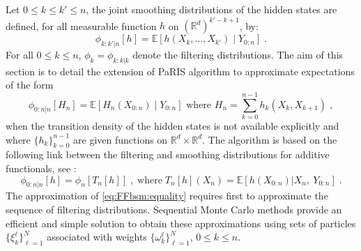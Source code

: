 \documentclass[12pt]{article}
\newcommand{\eqsp}{\;}
\newcommand{\1}{\mathrm{1}}
\newcommand{\E}{\mathbb{E}}
\begin{document}
Let $0 \leq k \leq k' \leq n$, the joint smoothing distributions of the hidden states are defined, for all measurable function $h$ on $(\mathbb{R}^d)^{k'-k + 1}$, by:
\[
\phi_{k:k'|n}[h] = \mathbb{E}\left[h(X_k,\ldots,X_{k'})\middle|Y_{0:n}\right]\eqsp.
\]
For all $0\le k\le n$, $\phi_{k} = \phi_{k:k|k}$ denote the filtering distributions. The aim of this section is to detail the extension of PaRIS algorithm to approximate expectations of the form
\begin{equation}
\label{def:addfunc}
\phi_{0:n\vert n}[H_{n}] = \mathbb{E}\left[H_n(X_{0:n})\middle|Y_{0:n}\right] \text{ where } H_n=\sum_{k=0}^{n-1}h_k(X_k,X_{k+1})\eqsp,
\end{equation}
when the transition density of the hidden states is not available explicitly and where $\{h_k\}_{k=0}^{n-1}$ are given functions on $\mathbb{R}^d\times \mathbb{R}^d$. 
The algorithm is based on the following link between the filtering and smoothing distributions for additive functionals, see \cite{olsson:westerborn:2016}:
\begin{equation}
\phi_{0:n|n}[h] = \phi_n[T_n[h]]\eqsp,\;\mbox{where}\; T_n[h](X_n) = \E\left[h(X_{0:n})\vert X_n,~Y_{0:n}\right]\eqsp.\label{eq:FFbsm:equality}
\end{equation}
The approximation of \eqref{eq:FFbsm:equality} requires first to approximate the sequence of filtering distributions. 
Sequential Monte Carlo methods provide an efficient and simple solution to obtain these approximations using sets of particles $\{\xi^{\ell}_k\}_{\ell=1}^N$ associated with weights $\{\omega^{\ell}_k\}_{\ell=1}^N$, $0\le k \le n$.
\end{document}
